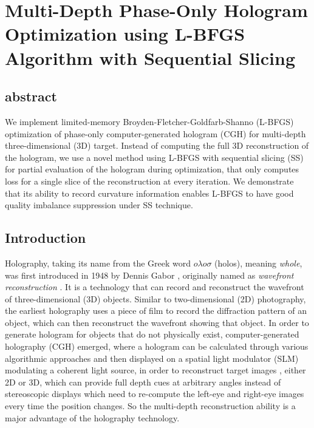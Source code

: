 \chapter{Multi-Depth Phase-Only Hologram Optimization using L-BFGS Algorithm with Sequential Slicing}\label{sec:Numerical Optimisation of Phase-Only CGH}

\graphicspath{{Chapter4/Figs/}}



\section{abstract}
	We implement limited-memory Broyden-Fletcher-Goldfarb-Shanno (L-BFGS) optimization of phase-only computer-generated hologram (CGH) for multi-depth three-dimensional (3D) target. Instead of computing the full 3D reconstruction of the hologram, we use a novel method using L-BFGS with sequential slicing (SS) for partial evaluation of the hologram during optimization, that only computes loss for a single slice of the reconstruction at every iteration. We demonstrate that its ability to record curvature information enables L-BFGS to have good quality imbalance suppression under SS technique.

\section{Introduction}
Holography, taking its name from the Greek word $o \lambda o \sigma $ (holos), meaning \textit{whole}, was first introduced in 1948 by Dennis Gabor \cite{Gabor1948}, originally named as \textit{wavefront reconstruction} \cite{Hecht2017}. It is a technology that can record and reconstruct the wavefront of three-dimensional (3D) objects. Similar to two-dimensional (2D) photography, the earliest holography uses a piece of film to record the diffraction pattern of an object, which can then reconstruct the wavefront showing that object. In order to generate hologram for objects that do not physically exist, computer-generated holography (CGH) emerged, where a hologram can be calculated through various algorithmic approaches and then displayed on a spatial light modulator (SLM) modulating a coherent light source, in order to reconstruct target images \cite{Cable2006,Seldowitz1987,Yang2009,Gerchberg1972}, either 2D or 3D, which can provide full depth cues at arbitrary angles instead of stereoscopic displays which need to re-compute the left-eye and right-eye images every time the position changes. So the multi-depth reconstruction ability is a major advantage of the holography technology.

